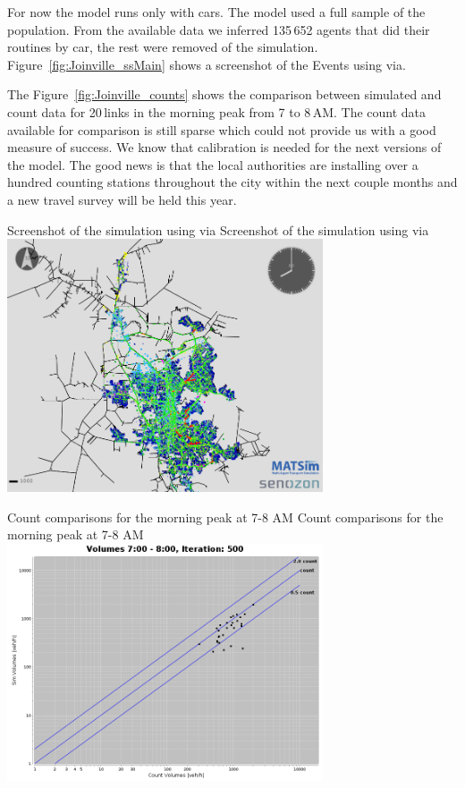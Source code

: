 For now the model runs only with cars. The model used a full sample of the population. From the available data we inferred 135\,652 agents that did their routines by car, the rest were removed of the simulation. Figure~\ref{fig:Joinville_ssMain} shows a screenshot of the Events using \gls{via}.

The Figure~\ref{fig:Joinville_counts} shows the comparison between simulated and count data for 20\,links in the morning peak from 7 to 8\,AM. The count data available for comparison is still sparse which could not provide us with a good measure of success. We know that calibration is needed for the next versions of the model. The good news is that the local authorities are installing over a hundred counting stations throughout the city within the next couple months and a new travel survey will be held this year. 

\createfigure%
{Screenshot of the simulation using \gls{via}}%
{Screenshot of the simulation using \gls{via}}%
{\label{fig:Joinville_ssMain}}%
{\includegraphics[width=0.7\textwidth, angle=0]{./scenarios/figures/Joinville_ssMain.png}}%
{}

\createfigure%
{Count comparisons for the morning peak at 7-8 AM}%
{Count comparisons for the morning peak at 7-8 AM}%
{\label{fig:Joinville_counts}}%
{\includegraphics[width=0.7\textwidth, angle=0]{./scenarios/figures/Joinville_LogManha.png}}%
{}

